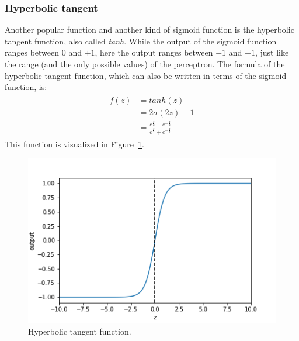\subsubsection{Hyperbolic tangent} %
\label{ssub:hyperbolic_tangent}
Another popular function and another kind of sigmoid function is the hyperbolic tangent function, also called \textit{tanh}. While the output of the sigmoid function ranges between $0$ and $+1$, here the output ranges between $-1$ and $+1$, just like the range (and the only possible values) of the perceptron.
The formula of the hyperbolic tangent function, which can also be written in terms of the sigmoid function, is:
\begin{align}
    \begin{split}
        f(z) &= tanh(z)\\
        &= 2\sigma(2z) - 1\\
        &= \frac{e^{\frac{z}{2}} - e^{-\frac{z}{2}}}{e^{\frac{z}{2}} + e^{-\frac{z}{2}}}
    \end{split}
\end{align}
This function is visualized in Figure~\ref{fig:tanh}.
\begin{figure}[htb]
    \centering
    \includegraphics[width=.8\linewidth]{images/activation_functions/tanh.png}
    \caption{Hyperbolic tangent function.}
    \label{fig:tanh}
\end{figure}


